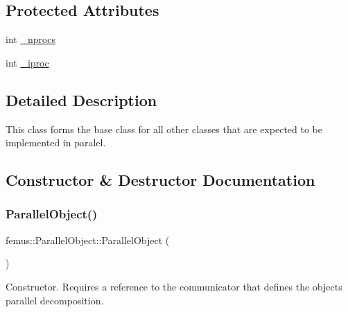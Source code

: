 \subsection*{Protected Attributes}
\begin{DoxyCompactItemize}
\item 
int \mbox{\hyperlink{classfemus_1_1_parallel_object_a0ee45f5bc96766fa25c736a40674e551}{\+\_\+nprocs}}
\item 
int \mbox{\hyperlink{classfemus_1_1_parallel_object_a15b46748a2e26bc263e3e6e4690e8a3b}{\+\_\+iproc}}
\end{DoxyCompactItemize}


\subsection{Detailed Description}
This class forms the base class for all other classes that are expected to be implemented in paralel. 

\subsection{Constructor \& Destructor Documentation}
\mbox{\label{classfemus_1_1_parallel_object_a5c6144ef5cf48fe2602f4bfba53b627e}} 
\subsubsection{\texorpdfstring{Parallel\+Object()}{ParallelObject()}}
{\footnotesize\ttfamily femus\+::\+Parallel\+Object\+::\+Parallel\+Object (\begin{DoxyParamCaption}{ }\end{DoxyParamCaption})\hspace{0.3cm}{\ttfamily [inline]}}

Constructor. Requires a reference to the communicator that defines the object\textquotesingle{}s parallel decomposition. \mbox{\label{classfemus_1_1_parallel_object_afbaa2c5604bf30e1f0ad164ec50970c8}} 
